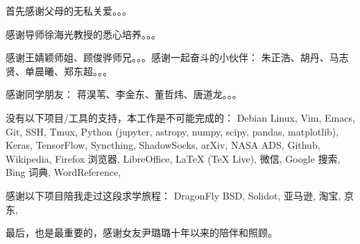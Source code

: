 \begin{thanks}

首先感谢父母的无私关爱。。。

感谢导师徐海光教授的悉心培养。。。

感谢王婧颖师姐、顾俊骅师兄。。。感谢一起奋斗的小伙伴：
朱正浩、胡丹、马志贤、单晨曦、郑东超。。。

感谢同学朋友：
蒋淏苇、李金东、董哲炜、唐道龙。。。

没有以下项目/工具的支持，本工作是不可能完成的：
Debian Linux,
Vim,
Emacs,
Git,
SSH,
Tmux,
Python (jupyter, astropy, numpy, scipy, pandas, matplotlib),
Keras,
TensorFlow,
Syncthing,
ShadowSocks,
arXiv,
NASA ADS,
Github,
Wikipedia,
Firefox 浏览器,
LibreOffice,
\LaTeX{} (\TeX{} Live),
微信,
Google 搜索,
Bing 词典,
WordReference,

感谢以下项目陪我走过这段求学旅程：
DragonFly BSD,
Solidot,
亚马逊,
淘宝,
京东,

最后，也是最重要的，感谢女友尹璐璐十年以来的陪伴和照顾。

\end{thanks}
